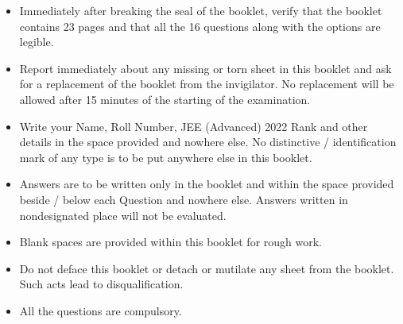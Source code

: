 \documentclass[10pt]{article}
\begin{document}
\begin{itemize}
    \item Immediately after breaking the seal of the booklet, verify that the booklet contains 23 pages and that all the 16 questions along with the options are legible.
\end{itemize}
\begin{itemize}
    \item Report immediately about any missing or torn sheet in this booklet and ask for a replacement of the booklet from the invigilator. No replacement will be allowed after 15 minutes of the starting of the examination.
\end{itemize}
\begin{itemize}
    \item Write your Name, Roll Number, JEE (Advanced) 2022 Rank and other details in the space provided and nowhere else. No distinctive / identification mark of any type is to be put anywhere else in this booklet.
\end{itemize}
\begin{itemize}
    \item Answers are to be written only in the booklet and within the space provided beside / below each Question and nowhere else. Answers written in nondesignated place will not be evaluated. 
\end{itemize}
\begin{itemize}
    \item Blank spaces are provided within this booklet for rough work.
\end{itemize}
\begin{itemize}
    \item Do not deface this booklet or detach or mutilate any sheet from the booklet. Such acts lead to disqualification.
\end{itemize}

\begin{itemize}
    \item All the questions are compulsory.
\end{itemize}
\end{document}
